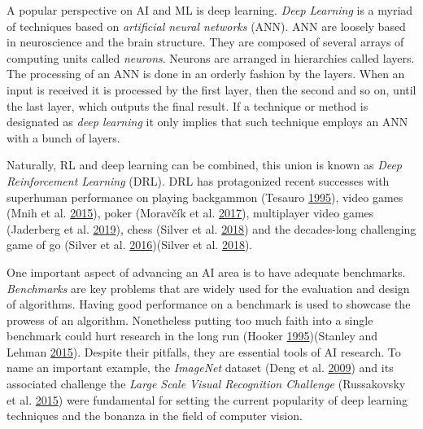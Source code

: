 \documentclass[
  12pt,
  openany]{book}
\begin{document}
A popular perspective on AI and ML is deep learning. \emph{Deep Learning} is a myriad of techniques based on \emph{artificial neural networks} (ANN). ANN are loosely based in neuroscience and the brain structure. They are composed of several arrays of computing units called \emph{neurons}. Neurons are arranged in hierarchies called layers. The processing of an ANN is done in an orderly fashion by the layers. When an input is received it is processed by the first layer, then the second and so on, until the last layer, which outputs the final result. If a technique or method is designated as \emph{deep learning} it only implies that such technique employs an ANN with a bunch of layers.

Naturally, RL and deep learning can be combined, this union is known as \emph{Deep Reinforcement Learning} (DRL). DRL has protagonized recent successes with superhuman performance on playing backgammon (Tesauro \protect\hyperlink{ref-tesauro1995temporal}{1995}), video games (Mnih et al. \protect\hyperlink{ref-mnih2015human}{2015}), poker (Moravčík et al. \protect\hyperlink{ref-moravvcik2017deepstack}{2017}), multiplayer video games (Jaderberg et al. \protect\hyperlink{ref-jaderberg2019human}{2019}), chess (Silver et al. \protect\hyperlink{ref-silver2018general}{2018}) and the decades-long challenging game of go (Silver et al. \protect\hyperlink{ref-silver2016mastering}{2016})(Silver et al. \protect\hyperlink{ref-silver2018general}{2018}).

One important aspect of advancing an AI area is to have adequate benchmarks. \emph{Benchmarks} are key problems that are widely used for the evaluation and design of algorithms. Having good performance on a benchmark is used to showcase the prowess of an algorithm. Nonetheless putting too much faith into a single benchmark could hurt research in the long run (Hooker \protect\hyperlink{ref-hooker1995testing}{1995})(Stanley and Lehman \protect\hyperlink{ref-stanley2015greatness}{2015}). Despite their pitfalls, they are essential tools of AI research. To name an important example, the \emph{ImageNet} dataset (Deng et al. \protect\hyperlink{ref-deng2009imagenet}{2009}) and its associated challenge the \emph{Large Scale Visual Recognition Challenge} (Russakovsky et al. \protect\hyperlink{ref-russakovsky2015imagenet}{2015}) were fundamental for setting the current popularity of deep learning techniques and the bonanza in the field of computer vision.
\end{document}
